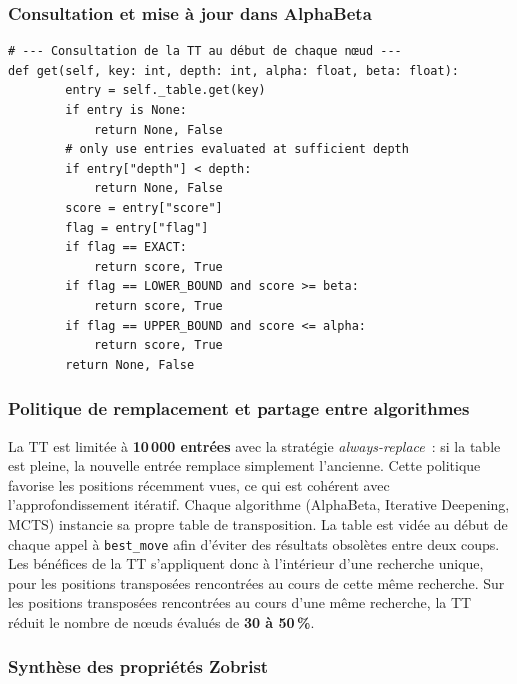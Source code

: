 \documentclass[a4paper,11pt]{article}
\begin{document}
\subsubsection{Consultation et mise à jour dans AlphaBeta}

\begin{verbatim}
# --- Consultation de la TT au début de chaque nœud ---
def get(self, key: int, depth: int, alpha: float, beta: float):
        entry = self._table.get(key)
        if entry is None:
            return None, False
        # only use entries evaluated at sufficient depth
        if entry["depth"] < depth:
            return None, False
        score = entry["score"]
        flag = entry["flag"]
        if flag == EXACT:
            return score, True
        if flag == LOWER_BOUND and score >= beta:
            return score, True
        if flag == UPPER_BOUND and score <= alpha:
            return score, True
        return None, False
\end{verbatim}

\subsubsection{Politique de remplacement et partage entre algorithmes}

La TT est limitée à \textbf{10\,000 entrées} avec la stratégie
\emph{always-replace}~: si la table est pleine, la nouvelle entrée remplace
simplement l'ancienne. Cette politique favorise les positions récemment vues,
ce qui est cohérent avec l'approfondissement itératif.
Chaque algorithme (AlphaBeta, Iterative Deepening, MCTS) instancie sa propre table de transposition.
La table est vidée au début de chaque appel à \texttt{best\_move} afin d'éviter des résultats obsolètes
entre deux coups. Les bénéfices de la TT s'appliquent donc à l'intérieur d'une recherche unique, pour
les positions transposées rencontrées au cours de cette même recherche.
Sur les positions transposées rencontrées au cours d'une même recherche,
la TT réduit le nombre de nœuds évalués de \textbf{30 à 50\,\%}.

\subsubsection{Synthèse des propriétés Zobrist}
\end{document}
